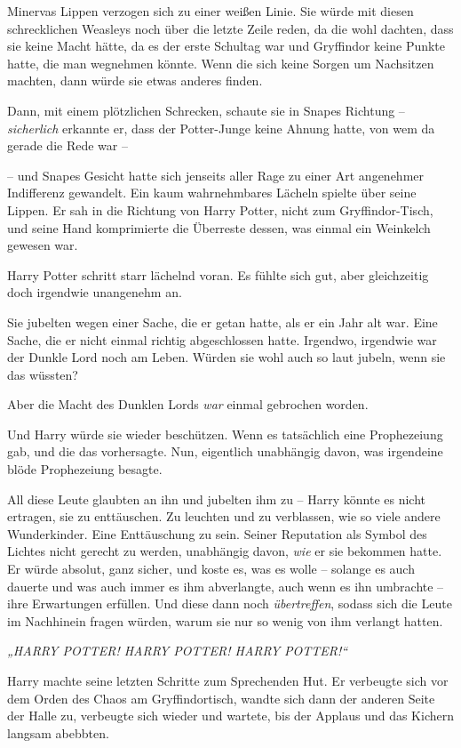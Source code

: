 Minervas Lippen verzogen sich zu einer weißen Linie. Sie würde mit diesen schrecklichen Weasleys noch über die letzte Zeile reden, da die wohl dachten, dass sie keine Macht hätte, da es der erste Schultag war und Gryffindor keine Punkte hatte, die man wegnehmen könnte. Wenn die sich keine Sorgen um Nachsitzen machten, dann würde sie etwas anderes finden.

Dann, mit einem plötzlichen Schrecken, schaute sie in Snapes Richtung – \emph{sicherlich} erkannte er, dass der Potter-Junge keine Ahnung hatte, von wem da gerade die Rede war –

– und Snapes Gesicht hatte sich jenseits aller Rage zu einer Art angenehmer Indifferenz gewandelt. Ein kaum wahrnehmbares Lächeln spielte über seine Lippen. Er sah in die Richtung von Harry Potter, nicht zum Gryffindor-Tisch, und seine Hand komprimierte die Überreste dessen, was einmal ein Weinkelch gewesen war.

\later

Harry Potter schritt starr lächelnd voran. Es fühlte sich gut, aber gleichzeitig doch irgendwie unangenehm an.

Sie jubelten wegen einer Sache, die er getan hatte, als er ein Jahr alt war. Eine Sache, die er nicht einmal richtig abgeschlossen hatte. Irgendwo, irgendwie war der Dunkle Lord noch am Leben. Würden sie wohl auch so laut jubeln, wenn sie das wüssten?

Aber die Macht des Dunklen Lords \emph{war } einmal gebrochen worden.

Und Harry würde sie wieder beschützen. Wenn es tatsächlich eine Prophezeiung gab, und die das vorhersagte. Nun, eigentlich unabhängig davon, was irgendeine blöde Prophezeiung besagte.

All diese Leute glaubten an ihn und jubelten ihm zu – Harry könnte es nicht ertragen, sie zu enttäuschen. Zu leuchten und zu verblassen, wie so viele andere Wunderkinder. Eine Enttäuschung zu sein. Seiner Reputation als Symbol des Lichtes nicht gerecht zu werden, unabhängig davon, \emph{wie} er sie bekommen hatte. Er würde absolut, ganz sicher, und koste es, was es wolle – solange es auch dauerte und was auch immer es ihm abverlangte, auch wenn es ihn umbrachte – ihre Erwartungen erfüllen. Und diese dann noch \emph{übertreffen}, sodass sich die Leute im Nachhinein fragen würden, warum sie nur so wenig von ihm verlangt hatten.

\emph{„HARRY POTTER! HARRY POTTER! HARRY POTTER!“}

Harry machte seine letzten Schritte zum Sprechenden Hut. Er verbeugte sich vor dem Orden des Chaos am Gryffindortisch, wandte sich dann der anderen Seite der Halle zu, verbeugte sich wieder und wartete, bis der Applaus und das Kichern langsam abebbten.

